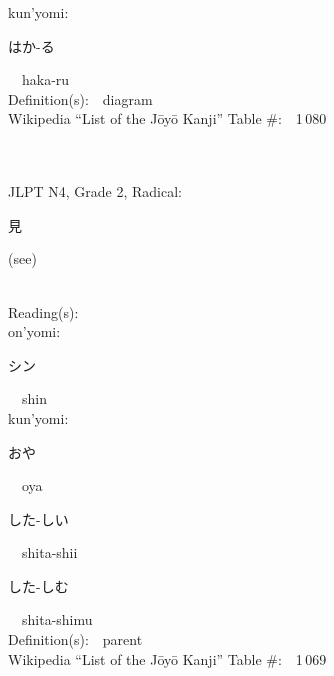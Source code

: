 \begin{multicols}{2}
{\hspace*{1em}}kun'yomi:\ \ \\
{\hspace*{2em}}{\begin{CJK}{UTF8}{min} はか-る \end{CJK}}\ \ haka-ru\ \ \\
Definition(s):\ \ diagram \\
Wikipedia ``List of the J\=oy\=o Kanji'' Table \#:\ \ 1\,080 \\
\ \ \\
{\fontsize{34pt}{40pt}  }\ \ \\  %
{JLPT N4, Grade 2, Radical:\ \ {\begin{CJK}{UTF8}{min} 見 \end{CJK}} (see) } \\
Reading(s):\ \ \\
{\hspace*{1em}}on'yomi:\ \ \\
{\hspace*{2em}}{\begin{CJK}{UTF8}{min} シン \end{CJK}}\ \ shin\ \ \\
{\hspace*{1em}}kun'yomi:\ \ \\
{\hspace*{2em}}{\begin{CJK}{UTF8}{min} おや \end{CJK}}\ \ oya\ \ \\
{\hspace*{2em}}{\begin{CJK}{UTF8}{min} した-しい \end{CJK}}\ \ shita-shii\ \ \\
{\hspace*{2em}}{\begin{CJK}{UTF8}{min} した-しむ \end{CJK}}\ \ shita-shimu\ \ \\
Definition(s):\ \ parent \\
Wikipedia ``List of the J\=oy\=o Kanji'' Table \#:\ \ 1\,069 \\
\ \ \\
{\fontsize{34pt}{40pt}  }\ \ \\  %

\end{multicols}
